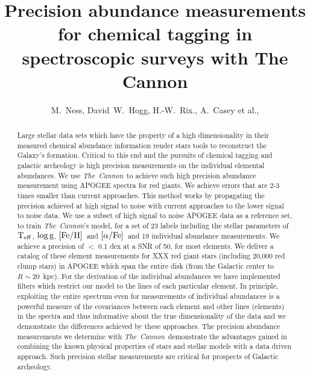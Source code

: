 \documentclass[12pt, preprint]{aastex}
\newcommand{\project}[1]{\textsl{#1}}
\newcommand{\tc}{\project{The~Cannon}}
\newcommand{\teff}{\mbox{$\rm T_{eff}$}}
\newcommand{\feh}{\mbox{$\rm [Fe/H]$}}
\newcommand{\alphafe}{\mbox{$\rm [\alpha/Fe]$}}
\newcommand{\logg}{\mbox{$\rm \log g$}}
\begin{document}
\title{Precision abundance measurements for chemical tagging in spectroscopic surveys with The Cannon}
\author{M.~Ness,
        David~W.~Hogg,
        H.-W.~Rix.,
         A.~Casey et al.,}


\begin{abstract}%
Large stellar data sets which have the property of a high dimensionality in their measured chemical abundance information render stars tools to reconstruct the Galaxy's formation. Critical to this end and the pursuits of chemical tagging and galactic archeology is high precision measurements on the individual elemental abundances. We use \tc\ to achieve such high precision abundance measurement using APOGEE spectra for red giants. We achieve errors that are 2-3 times smaller than current approaches.  This method works by propagating the precision achieved at high signal to noise with current approaches to the lower signal to noise data. We use a subset of high signal to noise APOGEE data as a reference set, to train \tc's model, for a set of 23 labels including the stellar parameters of \teff, \logg, \feh\ and \alphafe\ and 19 individual abundance measurements. We achieve a precision of $<$ 0.1 dex at a SNR of 50, for most elements.  We deliver a catalog of these element measurements for XXX red giant stars (including 20,000 red clump stars) in APOGEE which span the entire disk (from the Galactic center to $R\sim 20$~kpc). 
For the derivation of the individual abundances we have implemented filters which restrict our model to the lines of each particular element. In principle, exploiting the entire spectrum even for measurements of individual abundances is a powerful measure of the covariances between each element and other lines (elements) in the spectra and thus informative about the true dimensionality of the data and we demonstrate the differences achieved by these approaches. The precision abundance measurements we determine with \tc\ demonstrate the advantages gained in combining the known physical properties of stars and stellar models with a data driven approach. Such precision stellar measurements are critical for prospects of Galactic archeology.


\end{abstract}
\end{document}
